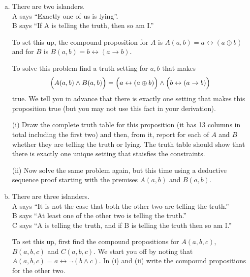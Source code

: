 \documentclass[12pt]{article}
\begin{document}
\begin{enumerate}[(a)]
    \item  There are two islanders.\\ A says “Exactly one of us is lying”.\\ B says “If A is telling the truth, then so am I.”

    To set this up, the compound proposition for $A$  is  $A(a,b) = a \leftrightarrow (a \oplus b)$\\ and for $B$ is $B(a,b) = b  \leftrightarrow (a \rightarrow b).$

    To solve this problem find a truth setting for $a,b$ that makes
    $$\Bigl(A(a,b) \wedge B(a,b)\Bigr)  = \Bigl( a \leftrightarrow (a \oplus b)\Bigr) \wedge \Bigl( b \leftrightarrow (a \rightarrow b)\Bigr)
    $$
true.  We tell you in advance that there is exactly one  setting that makes this proposition true (but you may not use this fact in your derivation). 

\medskip

(i) Draw the complete truth table for this proposition (it has 13 columns in total including the first two)
 and then, from it, report  for each of $A$ and $B$ whether they are telling the truth or lying. The truth table should show that there is exactly one unique setting that staisfies the constraints.

 
 (ii) Now solve the same problem again, but  this time using a deductive sequence proof starting with the premises $A(a,b)$ and $B(a,b).$
 

 
    \item There are three islanders.\\ A says “It is not the case that both the other two are telling
the truth.” \\ B says “At least one of the other two is telling the truth.” \\C says “A is
telling the truth, and if B is telling the truth then so am I.”


    To set this up,  first find the compound propositions for $A(a,b,c),$ $B(a,b,c)$ and $C(a,b,c).$
    We start you off by noting that 
     $A(a,b,c) = a \leftrightarrow \neg(b \wedge c)$. In (i) and (ii) write the compound propositions for the other two.
     
     

\end{enumerate}
\end{document}
